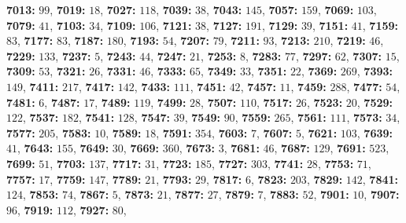 \textsf{\bfseries 7013:} $99$, \textsf{\bfseries 7019:} $18$, \textsf{\bfseries 7027:} $118$, \textsf{\bfseries 7039:} $38$, \textsf{\bfseries 7043:} $145$, \textsf{\bfseries 7057:} $159$, \textsf{\bfseries 7069:} $103$, \textsf{\bfseries 7079:} $41$, \textsf{\bfseries 7103:} $34$, \textsf{\bfseries 7109:} $106$, \textsf{\bfseries 7121:} $38$, \textsf{\bfseries 7127:} $191$, \textsf{\bfseries 7129:} $39$, \textsf{\bfseries 7151:} $41$, \textsf{\bfseries 7159:} $83$, \textsf{\bfseries 7177:} $83$, \textsf{\bfseries 7187:} $180$, \textsf{\bfseries 7193:} $54$, \textsf{\bfseries 7207:} $79$, \textsf{\bfseries 7211:} $93$, \textsf{\bfseries 7213:} $210$, \textsf{\bfseries 7219:} $46$, \textsf{\bfseries 7229:} $133$, \textsf{\bfseries 7237:} $5$, \textsf{\bfseries 7243:} $44$, \textsf{\bfseries 7247:} $21$, \textsf{\bfseries 7253:} $8$, \textsf{\bfseries 7283:} $77$, \textsf{\bfseries 7297:} $62$, \textsf{\bfseries 7307:} $15$, \textsf{\bfseries 7309:} $53$, \textsf{\bfseries 7321:} $26$, \textsf{\bfseries 7331:} $46$, \textsf{\bfseries 7333:} $65$, \textsf{\bfseries 7349:} $33$, \textsf{\bfseries 7351:} $22$, \textsf{\bfseries 7369:} $269$, \textsf{\bfseries 7393:} $149$, \textsf{\bfseries 7411:} $217$, \textsf{\bfseries 7417:} $142$, \textsf{\bfseries 7433:} $111$, \textsf{\bfseries 7451:} $42$, \textsf{\bfseries 7457:} $11$, \textsf{\bfseries 7459:} $288$, \textsf{\bfseries 7477:} $54$, \textsf{\bfseries 7481:} $6$, \textsf{\bfseries 7487:} $17$, \textsf{\bfseries 7489:} $119$, \textsf{\bfseries 7499:} $28$, \textsf{\bfseries 7507:} $110$, \textsf{\bfseries 7517:} $26$, \textsf{\bfseries 7523:} $20$, \textsf{\bfseries 7529:} $122$, \textsf{\bfseries 7537:} $182$, \textsf{\bfseries 7541:} $128$, \textsf{\bfseries 7547:} $39$, \textsf{\bfseries 7549:} $90$, \textsf{\bfseries 7559:} $265$, \textsf{\bfseries 7561:} $111$, \textsf{\bfseries 7573:} $34$, \textsf{\bfseries 7577:} $205$, \textsf{\bfseries 7583:} $10$, \textsf{\bfseries 7589:} $18$, \textsf{\bfseries 7591:} $354$, \textsf{\bfseries 7603:} $7$, \textsf{\bfseries 7607:} $5$, \textsf{\bfseries 7621:} $103$, \textsf{\bfseries 7639:} $41$, \textsf{\bfseries 7643:} $155$, \textsf{\bfseries 7649:} $30$, \textsf{\bfseries 7669:} $360$, \textsf{\bfseries 7673:} $3$, \textsf{\bfseries 7681:} $46$, \textsf{\bfseries 7687:} $129$, \textsf{\bfseries 7691:} $523$, \textsf{\bfseries 7699:} $51$, \textsf{\bfseries 7703:} $137$, \textsf{\bfseries 7717:} $31$, \textsf{\bfseries 7723:} $185$, \textsf{\bfseries 7727:} $303$, \textsf{\bfseries 7741:} $28$, \textsf{\bfseries 7753:} $71$, \textsf{\bfseries 7757:} $17$, \textsf{\bfseries 7759:} $147$, \textsf{\bfseries 7789:} $21$, \textsf{\bfseries 7793:} $29$, \textsf{\bfseries 7817:} $6$, \textsf{\bfseries 7823:} $203$, \textsf{\bfseries 7829:} $142$, \textsf{\bfseries 7841:} $124$, \textsf{\bfseries 7853:} $74$, \textsf{\bfseries 7867:} $5$, \textsf{\bfseries 7873:} $21$, \textsf{\bfseries 7877:} $27$, \textsf{\bfseries 7879:} $7$, \textsf{\bfseries 7883:} $52$, \textsf{\bfseries 7901:} $10$, \textsf{\bfseries 7907:} $96$, \textsf{\bfseries 7919:} $112$, \textsf{\bfseries 7927:} $80$, 
